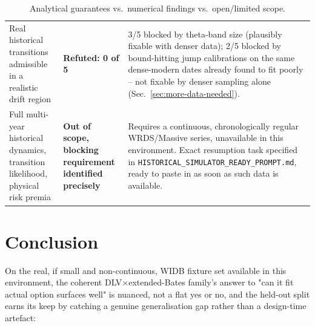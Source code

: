 \begin{table}[H]
\begin{tabular}{p{5.4cm}p{2.6cm}p{6.2cm}}
Real historical transitions admissible in a realistic drift region &
  \textbf{Refuted: 0 of 5} & 3/5 blocked by theta-band size (plausibly fixable with denser data); 2/5 blocked by bound-hitting jump calibrations on the same dense-modern dates already found to fit poorly -- not fixable by denser sampling alone (Sec.~\ref{sec:more-data-needed}). \\
Full multi-year historical dynamics, transition likelihood, physical risk premia &
  \textbf{Out of scope, blocking requirement identified precisely} & Requires a continuous, chronologically regular WRDS/Massive series, unavailable in this environment. Exact resumption task specified in \texttt{HISTORICAL\_SIMULATOR\_READY\_PROMPT.md}, ready to paste in as soon as such data is available. \\
\bottomrule
\end{tabular}
\caption{Analytical guarantees vs.\ numerical findings vs.\ open/limited scope.}
\label{tab:deferred-real-data}
\end{table}

\section{Conclusion}
\label{sec:conclusion-real-data}

On the real, if small and non-continuous, WIDB fixture set available in
this environment, the coherent DLV$\times$extended-Bates family's answer to
"can it fit actual option surfaces well" is nuanced, not a flat yes or no,
and the held-out split earns its keep by catching a genuine generalisation
gap rather than a design-time artefact:

